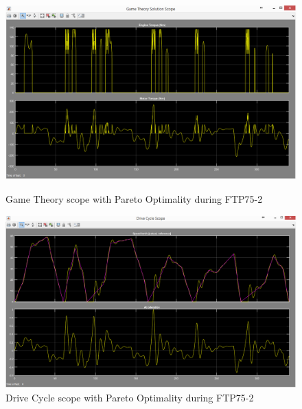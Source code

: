 \begin{figure}[hp]
\centering
\includegraphics[scale=0.45]{figures/Pareto/FTP75-2/gameTheory03Juli}
\caption{Game Theory scope with Pareto Optimality during FTP75-2}
\label{fig:gtpo2}
\includegraphics[scale=0.41]{figures/Pareto/FTP75-2/driveCycle03Juli}
\caption{Drive Cycle scope with Pareto Optimality during FTP75-2}
\label{fig:dcpo2}
\end{figure}

